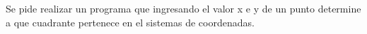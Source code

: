 Se pide realizar un programa que ingresando el valor x e y de un punto determine a que cuadrante pertenece en el sistemas de coordenadas.
